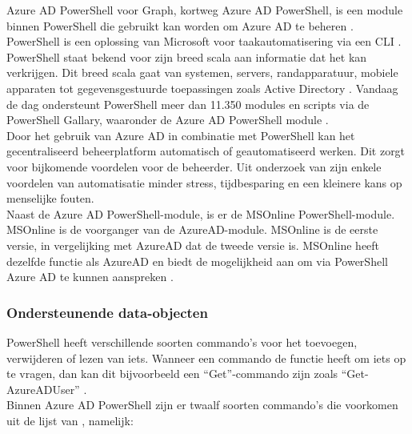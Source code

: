 
Azure \ac{AD} PowerShell voor Graph, kortweg Azure \ac{AD} PowerShell, is een module binnen PowerShell die gebruikt kan worden om Azure \ac{AD} te beheren \autocite{Microsoft2023}. PowerShell is een oplossing van Microsoft voor taakautomatisering via een \ac{CLI} \autocite{Microsoft2022}. \\

PowerShell staat bekend voor zijn breed scala aan informatie dat het kan verkrijgen. Dit breed scala gaat van systemen, servers, randapparatuur, mobiele apparaten tot gegevensgestuurde toepassingen zoals Active Directory \autocite{Hosmer2019}. Vandaag de dag ondersteunt PowerShell meer dan 11.350 modules en scripts via de PowerShell Gallary, waaronder de Azure \ac{AD} PowerShell module \autocite{Microsoft2023a}. \\

Door het gebruik van Azure \ac{AD} in combinatie met PowerShell kan het gecentraliseerd beheerplatform automatisch of geautomatiseerd werken. Dit zorgt voor bijkomende voordelen voor de beheerder. Uit onderzoek van \textcite{Breton2003} zijn enkele voordelen van automatisatie minder stress, tijdbesparing en een kleinere kans op menselijke fouten. \\

Naast de Azure \ac{AD} PowerShell-module, is er de MSOnline PowerShell-module. MSOnline is de voorganger van de AzureAD-module. MSOnline is de eerste versie, in vergelijking met AzureAD dat de tweede versie is. MSOnline heeft dezelfde functie als AzureAD en biedt de mogelijkheid aan om via PowerShell Azure \ac{AD} te kunnen aanspreken \autocite{Prigent2019}.

\subsubsection{Ondersteunende data-objecten}


PowerShell heeft verschillende soorten commando's voor het toevoegen, verwijderen of lezen van iets. Wanneer een commando de functie heeft om iets op te vragen, dan kan dit bijvoorbeeld een “Get”-commando zijn zoals “Get-AzureADUser” \autocite{Microsoft2023i}. \\

Binnen Azure AD PowerShell zijn er twaalf soorten commando's die voorkomen uit de lijst van \textcite{Microsoft2023i}, namelijk:

